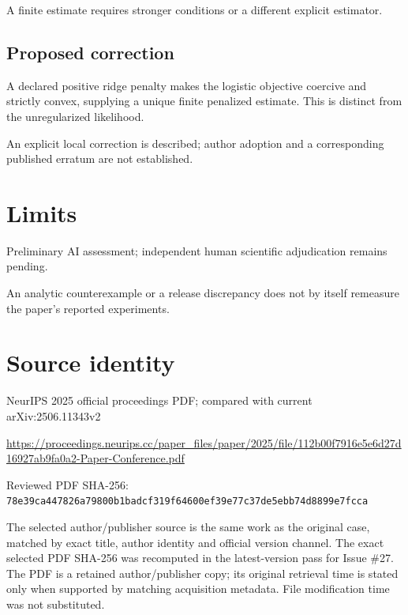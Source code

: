\documentclass[11pt]{article}
\begin{document}
A finite estimate requires stronger conditions or a different explicit estimator.

\subsection*{Proposed correction}

A declared positive ridge penalty makes the logistic objective coercive and strictly convex, supplying a unique finite penalized estimate. This is distinct from the unregularized likelihood.

An explicit local correction is described; author adoption and a corresponding published erratum are not established.

\section*{Limits}

Preliminary AI assessment; independent human scientific adjudication remains pending.\par

An analytic counterexample or a release discrepancy does not by itself remeasure the paper’s reported experiments.\par

\section*{Source identity}

NeurIPS 2025 official proceedings PDF; compared with current arXiv:2506.11343v2

\url{https://proceedings.neurips.cc/paper_files/paper/2025/file/112b00f7916e5e6d27d16927ab9fa0a2-Paper-Conference.pdf}

Reviewed PDF SHA-256: \nolinkurl{78e39ca447826a79800b1badcf319f64600ef39e77c37de5ebb74d8899e7fcca}

The selected author/publisher source is the same work as the original case, matched by exact title, author identity and official version channel. The exact selected PDF SHA-256 was recomputed in the latest-version pass for Issue \#27. The PDF is a retained author/publisher copy; its original retrieval time is stated only when supported by matching acquisition metadata. File modification time was not substituted.
\end{document}
